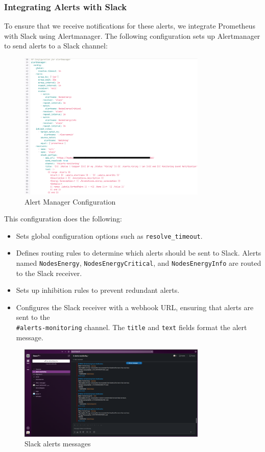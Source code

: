 \subsubsection{Integrating Alerts with Slack}

To ensure that we receive notifications for these alerts, we integrate Prometheus with Slack using Alertmanager. The following configuration sets up Alertmanager to send alerts to a Slack channel:

\begin{figure}[H]
    \centering
    \includegraphics[width=0.8\textwidth]{Figures/alert-manager.png}
    \caption{Alert Manager Configuration}
  \end{figure}

This configuration does the following:

\begin{itemize}
  \item Sets global configuration options such as \texttt{resolve\_timeout}.
  \item Defines routing rules to determine which alerts should be sent to Slack. Alerts named \texttt{NodesEnergy}, \texttt{NodesEnergyCritical}, and \texttt{NodesEnergyInfo} are routed to the Slack receiver.
  \item Sets up inhibition rules to prevent redundant alerts.
  \item Configures the Slack receiver with a webhook URL, ensuring that alerts are sent to the \\
  \texttt{\#alerts-monitoring} channel. The \texttt{title} and \texttt{text} fields format the alert message.
\end{itemize}

\begin{figure}[H]
  \centering
  \includegraphics[width=0.8\textwidth]{Figures/slack-green-it channel.png}
  \caption{Slack alerts messages}
\end{figure}

